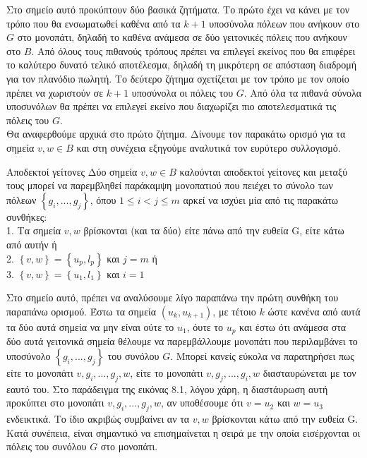 \documentclass[oneside,12pt]{book}
\theoremstyle{definition}
\begin{document}
Στο σημείο αυτό προκύπτουν δύο βασικά ζητήματα. Το πρώτο έχει να κάνει με τον τρόπο που θα ενσωματωθεί καθένα από τα \(k+1\) υποσύνολα πόλεων που ανήκουν στο \(G\) στο μονοπάτι, δηλαδή το καθένα ανάμεσα σε δύο γειτονικές πόλεις που ανήκουν στο \(B\). Από όλους τους πιθανούς τρόπους πρέπει να επιλεγεί εκείνος που θα επιφέρει το καλύτερο δυνατό τελικό αποτέλεσμα, δηλαδή τη μικρότερη σε απόσταση διαδρομή για τον πλανόδιο πωλητή. Το δεύτερο ζήτημα σχετίζεται με τον τρόπο με τον οποίο πρέπει να χωριστούν σε \(k+1\) υποσύνολα οι πόλεις του \(G\). Από όλα τα πιθανά σύνολα υποσυνόλων θα πρέπει να επιλεγεί εκείνο που διαχωρίζει πιο αποτελεσματικά τις πόλεις του \(G\). \\

Θα αναφερθούμε αρχικά στο πρώτο ζήτημα. Δίνουμε τον παρακάτω ορισμό για τα σημεία \(v,w \in B\) και στη συνέχεια εξηγούμε αναλυτικά τον ευρύτερο συλλογισμό.

\begin{mydefinition}{Αποδεκτοί γείτονες}{}
	Δύο σημεία \(v,w \in B\) καλούνται αποδεκτοί γείτονες και μεταξύ τους μπορεί να παρεμβληθεί παράκαμψη μονοπατιού που πειέχει το σύνολο των πόλεων \(\left\{g_i,...,g_j\right\}\), όπου \(1 \leq i < j \leq m\) αρκεί να ισχύει μία από τις παρακάτω συνθήκες: \\
	1. Τα σημεία \(v,w\) βρίσκονται (και τα δύο) είτε πάνω από την ευθεία G, είτε κάτω από αυτήν ή \\
	2. \(\left\{v,w\right\} = \left\{u_p, l_p\right\}\) και \(j = m\) ή \\
	3. \(\left\{v,w\right\} = \left\{u_1, l_1\right\}\) και \(i = 1\) 
\end{mydefinition} 

Στο σημείο αυτό, πρέπει να αναλύσουμε λίγο παραπάνω την πρώτη συνθήκη του παραπάνω ορισμού. Έστω τα σημεία \((u_k, u_{k+1})\), με τέτοιο \(k\) ώστε κανένα από αυτά τα δύο αυτά σημεία να μην είναι ούτε το \(u_1\), όυτε το \(u_p\) και έστω ότι ανάμεσα στα δύο αυτά γειτονικά σημεία θέλουμε να παρεμβάλλουμε μονοπάτι που περιλαμβάνει το υποσύνολο \(\left\{g_i,...,g_j\right\}\) του συνόλου \(G\). Μπορεί κανείς εύκολα να παρατηρήσει πως είτε το μονοπάτι \(v,g_i,...,g_j, w\), είτε το μονοπάτι \(v,g_j,...,g_i,w\) διασταυρώνεται με τον εαυτό του. Στο παράδειγμα της εικόνας 8.1, λόγου χάρη, η διαστάυρωση αυτή προκύπτει στο μονοπάτι \(v,g_i,...,g_j, w\), αν υποθέσουμε ότι \(v = u_2\) και \(w = u_3\) ενδεικτικά. Το ίδιο ακριβώς συμβαίνει αν τα \(v,w\) βρίσκονται κάτω από την ευθεία G. Κατά συνέπεια, είναι σημαντικό να επισημαίνεται η σειρά με την οποία εισέρχονται οι πόλεις του συνόλου \(G\) στο μονοπάτι. \\ 
\end{document}
